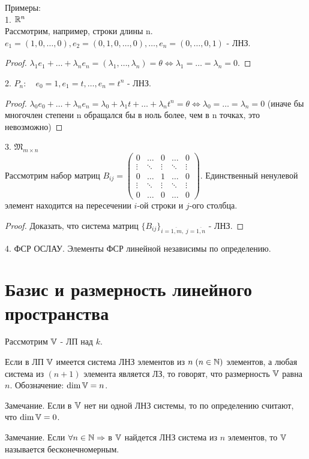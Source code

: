 \documentclass[../main.tex]{subfiles}
\begin{document}
Примеры:
\\1. $\mathbb{R}^{n}$
\\Рассмотрим, например, строки длины n. $e_{1}=(1,0,\dots,0), e_{2}=(0,1,0,\dots,0),\dots,e_{n}=(0,\dots,0,1)$ - ЛНЗ. 
\begin{proof}
    $\lambda_{1}e_{1} + \dots + \lambda_{n}e_{n} = (\lambda_{1},\dots,\lambda_{n}) = \theta \Leftrightarrow \lambda_{1}=\dots=\lambda_{n}=0$.
\end{proof}
2. $P_{n}: \quad e_{0}=1, e_{1} = t ,\dots, e_{n}=t^{n}$ - ЛНЗ.
\begin{proof}
    $\lambda_{0}e_{0}+\dots+\lambda_{n}e_{n}=\lambda_{0}+\lambda_{1}t+\dots+\lambda_{n}t^{n}=\theta \Leftrightarrow \lambda_{0}=\dots=\lambda_{n}=0$ (иначе бы многочлен степени  n обращался бы в ноль более, чем в n точках, это невозможно)
\end{proof}
3. $\mathfrak{M}_{m\times n}$
\\Рассмотрим набор матриц $B_{ij}= \begin{pmatrix}
    0& \dots & 0 & \dots &0\\ 
    \vdots & \ddots & \vdots & \ddots & \vdots\\
    0& \dots & 1 & \dots & 0 \\ 
    \vdots & \ddots & \vdots & \ddots & \vdots \\
    0& \dots & 0 & \dots & 0
\end{pmatrix}$. Единственный ненулевой элемент находится на пересечении $i$-ой строки и $j$-ого столбца.
\begin{proof}
    Доказать, что система матриц $\{B_{ij}\}_{i=\overline{1,m},\;j=\overline{1,n}}$ - ЛНЗ.
\end{proof}
4. ФСР ОСЛАУ. Элементы ФСР линейной независимы по определению.

\section{Базис и размерность линейного пространства}
Рассмотрим $\mathbb{V}$ - ЛП над $k$. 
\begin{definition}
    Если в ЛП $\mathbb{V}$ имеется система ЛНЗ элементов из $n\;(n\in \mathbb{N})$ элементов, а любая система из $(n+1)$ элемента является ЛЗ, то говорят, что размерность $\mathbb{V}$ равна $n$. Обозначение: $\dim \mathbb{V} = n$.

\end{definition}
Замечание. Если в $\mathbb{V}$ нет ни одной ЛНЗ системы, то по определению считают, что $\dim \mathbb{V} = 0$.

Замечание. Если $\forall n\in\mathbb{N}\Rightarrow $ в $\mathbb{V}$ найдется ЛНЗ система из $n$ элементов, то $\mathbb{V}$ называется бесконечномерным.
\end{document}
